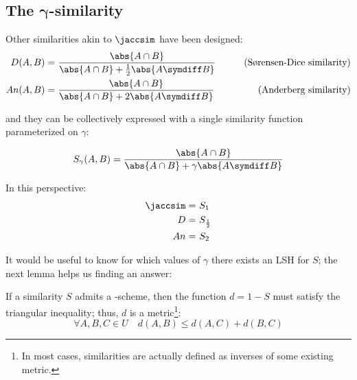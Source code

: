 \subsection[\texorpdfstring{The $\gamma$-similarity}{The gamma-similarity}]{The $\bm\gamma$-similarity}

Other similarities akin to $\jaccsim$ have been designed:
\begin{align*}
    D(A, B)  =&\ \frac{\abs{A \cap B}}{\abs{A \cap B} + \frac{1}{2} \abs{A \symdiff B}} & \tag{S\o{}rensen-Dice similarity} \\
    An(A, B) =&\ \frac{\abs{A \cap B}}{\abs{A \cap B} + 2 \abs{A \symdiff B}}           & \tag{Anderberg similarity}
\end{align*}

and they can be collectively expressed with a single similarity function parameterized on $\gamma$:

\begin{definition}
    \begin{equation}
    \displaystyle S_\gamma(A, B) = \frac{\abs{A \cap B}}{\abs{A \cap B} + \gamma \abs{A \symdiff B}}
    \end{equation}
\end{definition}

In this perspective:
\begin{align*}
    \jaccsim =&\ S_1 \\
    D        =&\ S_\frac{1}{2} \\
    An       =&\ S_2
\end{align*}

It would be useful to know for which values of $\gamma$ there exists an LSH for $S$; the next lemma helps us finding an answer:

\begin{lemma}[Charikar] \label{lem:charikar}
    If a similarity $S$ admits a \lsh-scheme, then the function $d = 1 - S$ must satisfy the triangular inequality; thus, $d$ is a metric\footnote{In most cases, similarities are actually defined as inverses of some existing metric.}:
    \[
        \forall A, B, C \in U \quad d(A, B) \leq d(A, C) + d(B, C)
    \]
\end{lemma}

